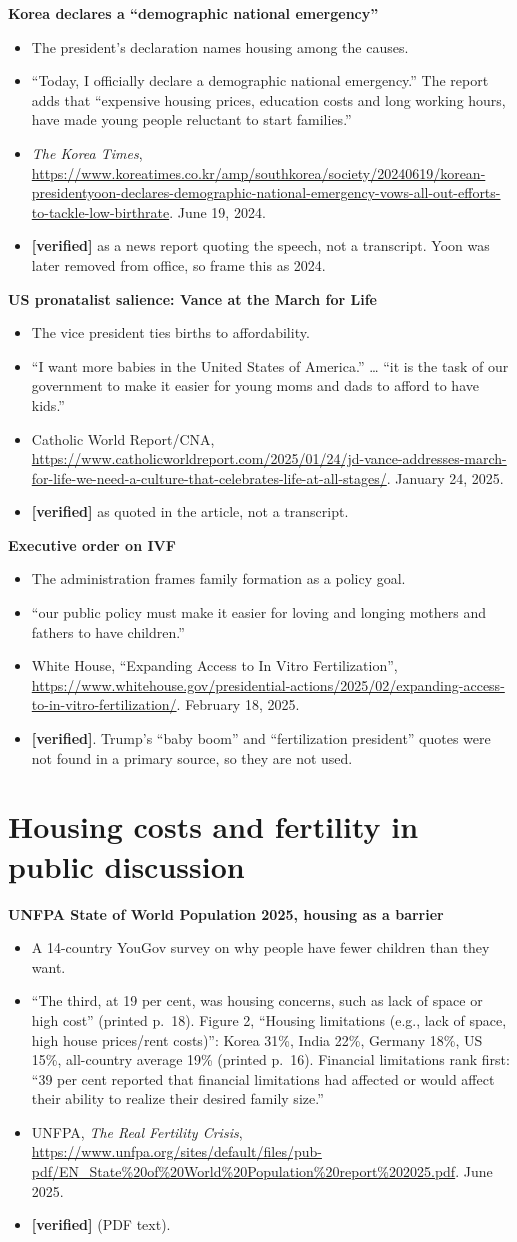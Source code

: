 \documentclass[10pt]{article}
\newcommand{\ok}{\textcolor{green!45!black}{\textbf{[verified]}}}
\newcommand{\entry}[5]{%
  \textbf{#1}\par
  \begin{itemize}
    \item #2
    \item #3
    \item #4
    \item #5
  \end{itemize}}
\begin{document}
\entry{Korea declares a ``demographic national emergency''}
{The president's declaration names housing among the causes.}
{``Today, I officially declare a demographic national emergency.'' The report adds that ``expensive housing prices, education costs and long working hours, have made young people reluctant to start families.''}
{\emph{The Korea Times}, \url{https://www.koreatimes.co.kr/amp/southkorea/society/20240619/korean-presidentyoon-declares-demographic-national-emergency-vows-all-out-efforts-to-tackle-low-birthrate}. June 19, 2024.}
{\ok{} as a news report quoting the speech, not a transcript. Yoon was later removed from office, so frame this as 2024.}

\entry{US pronatalist salience: Vance at the March for Life}
{The vice president ties births to affordability.}
{``I want more babies in the United States of America.'' \ldots{} ``it is the task of our government to make it easier for young moms and dads to afford to have kids.''}
{Catholic World Report/CNA, \url{https://www.catholicworldreport.com/2025/01/24/jd-vance-addresses-march-for-life-we-need-a-culture-that-celebrates-life-at-all-stages/}. January 24, 2025.}
{\ok{} as quoted in the article, not a transcript.}

\entry{Executive order on IVF}
{The administration frames family formation as a policy goal.}
{``our public policy must make it easier for loving and longing mothers and fathers to have children.''}
{White House, ``Expanding Access to In Vitro Fertilization'', \url{https://www.whitehouse.gov/presidential-actions/2025/02/expanding-access-to-in-vitro-fertilization/}. February 18, 2025.}
{\ok. Trump's ``baby boom'' and ``fertilization president'' quotes were not found in a primary source, so they are not used.}

\section{Housing costs and fertility in public discussion}

\entry{UNFPA State of World Population 2025, housing as a barrier}
{A 14-country YouGov survey on why people have fewer children than they want.}
{``The third, at 19 per cent, was housing concerns, such as lack of space or high cost'' (printed p.~18). Figure 2, ``Housing limitations (e.g., lack of space, high house prices/rent costs)'': Korea 31\%, India 22\%, Germany 18\%, US 15\%, all-country average 19\% (printed p.~16). Financial limitations rank first: ``39 per cent reported that financial limitations had affected or would affect their ability to realize their desired family size.''}
{UNFPA, \emph{The Real Fertility Crisis}, \url{https://www.unfpa.org/sites/default/files/pub-pdf/EN_State\%20of\%20World\%20Population\%20report\%202025.pdf}. June 2025.}
{\ok{} (PDF text).}
\end{document}
